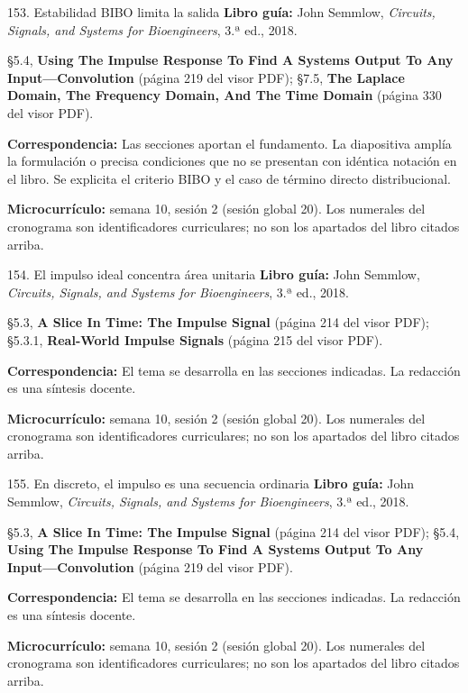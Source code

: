 \documentclass[
  10pt,
  ignorenonframetext,
  aspectratio=169,
  spanish,
]{beamer}
\begin{document}
\begin{frame}{153. Estabilidad BIBO limita la salida}
\label{estabilidad-bibo-limita-la-salida}
\textbf{Libro guía:} John Semmlow, \emph{Circuits, Signals, and Systems
for Bioengineers}, 3.ª ed., 2018.

§5.4, \textbf{Using The Impulse Response To Find A Systems Output To Any
Input---Convolution} (página 219 del visor PDF); §7.5, \textbf{The
Laplace Domain, The Frequency Domain, And The Time Domain} (página 330
del visor PDF).

\textbf{Correspondencia:} Las secciones aportan el fundamento. La
diapositiva amplía la formulación o precisa condiciones que no se
presentan con idéntica notación en el libro. Se explicita el criterio
BIBO y el caso de término directo distribucional.

\textbf{Microcurrículo:} semana 10, sesión 2 (sesión global 20). Los
numerales del cronograma son identificadores curriculares; no son los
apartados del libro citados arriba.
\end{frame}

\begin{frame}{154. El impulso ideal concentra área unitaria}
\label{el-impulso-ideal-concentra-uxe1rea-unitaria}
\textbf{Libro guía:} John Semmlow, \emph{Circuits, Signals, and Systems
for Bioengineers}, 3.ª ed., 2018.

§5.3, \textbf{A Slice In Time: The Impulse Signal} (página 214 del visor
PDF); §5.3.1, \textbf{Real-World Impulse Signals} (página 215 del visor
PDF).

\textbf{Correspondencia:} El tema se desarrolla en las secciones
indicadas. La redacción es una síntesis docente.

\textbf{Microcurrículo:} semana 10, sesión 2 (sesión global 20). Los
numerales del cronograma son identificadores curriculares; no son los
apartados del libro citados arriba.
\end{frame}

\begin{frame}{155. En discreto, el impulso es una secuencia ordinaria}
\label{en-discreto-el-impulso-es-una-secuencia-ordinaria}
\textbf{Libro guía:} John Semmlow, \emph{Circuits, Signals, and Systems
for Bioengineers}, 3.ª ed., 2018.

§5.3, \textbf{A Slice In Time: The Impulse Signal} (página 214 del visor
PDF); §5.4, \textbf{Using The Impulse Response To Find A Systems Output
To Any Input---Convolution} (página 219 del visor PDF).

\textbf{Correspondencia:} El tema se desarrolla en las secciones
indicadas. La redacción es una síntesis docente.

\textbf{Microcurrículo:} semana 10, sesión 2 (sesión global 20). Los
numerales del cronograma son identificadores curriculares; no son los
apartados del libro citados arriba.
\end{frame}
\end{document}
